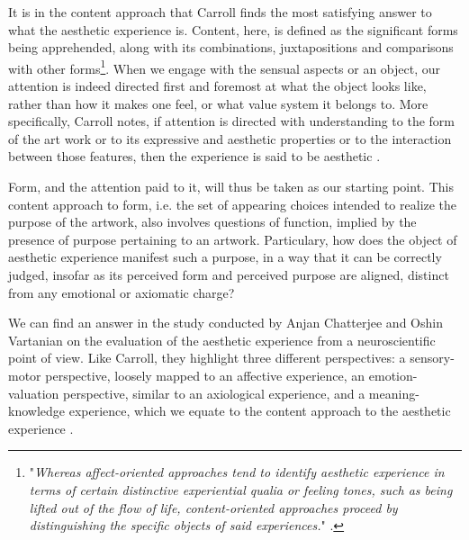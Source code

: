 It is in the content approach that Carroll finds the most satisfying answer to what the aesthetic experience is. Content, here, is defined as the significant forms being apprehended, along with its combinations, juxtapositions and comparisons with other forms\footnote{"\emph{Whereas affect-oriented approaches tend to identify aesthetic experience in terms of certain distinctive experiential qualia or feeling tones, such as being lifted out of the flow of life, content-oriented approaches proceed by distinguishing the specific objects of said experiences.}" \citep{carroll_aesthetic_2002}.}. When we engage with the sensual aspects or an object, our attention is indeed directed first and foremost at what the object looks like, rather than how it makes one feel, or what value system it belongs to. More specifically, Carroll notes, if attention is directed with understanding to the form of the art work or to its expressive and aesthetic properties or to the interaction between those features, then the experience is said to be aesthetic \citep{carroll_aesthetic_2002}.

Form, and the attention paid to it, will thus be taken as our starting point.  This content approach to form, i.e. the set of appearing choices intended to realize the purpose of the artwork, also involves questions of function, implied by the presence of purpose pertaining to an artwork. Particulary, how does the object of aesthetic experience manifest such a purpose, in a way that it can be correctly judged, insofar as its perceived form and perceived purpose are aligned, distinct from any emotional or axiomatic charge?

We can find an answer in the study conducted by Anjan Chatterjee and Oshin Vartanian on the evaluation of the aesthetic experience from a neuroscientific point of view. Like Carroll, they highlight three different perspectives: a sensory-motor perspective, loosely mapped to an affective experience, an emotion-valuation perspective, similar to an axiological experience, and a meaning-knowledge experience, which we equate to the content approach to the aesthetic experience \citep{chatterjee_neuroscience_2016}.

